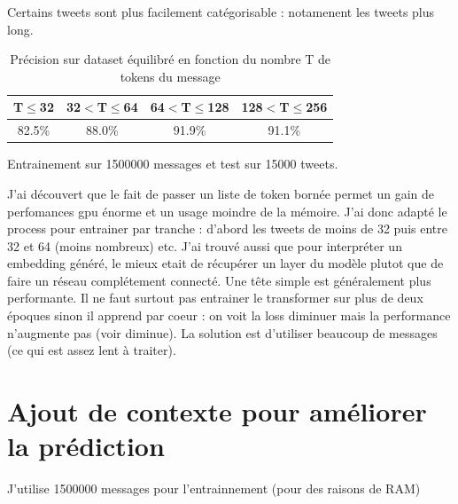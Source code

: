 \documentclass[12pt]{article}
\begin{document}
Certains tweets sont plus facilement catégorisable : notamenent les tweets plus long.


\begin{table}[h]
\caption{Précision sur dataset équilibré en fonction du nombre T de tokens du message}
\centering
\begin{tabular}{cccc}
\toprule
T$\le$32 & 32$<$T$\le$64 & 64$<$T$\le$128 & 128$<$T$\le$256 \\
\midrule
82.5\% & 88.0\% & 91.9\% & 91.1\% \\
\bottomrule
\end{tabular}

\vspace{2mm}
{\centering \small Entrainement sur 1500000 messages et test sur 15000 tweets.\par}

\end{table}


J'ai découvert que le fait de passer un liste de token bornée permet un gain de perfomances gpu énorme et un usage moindre de la mémoire.
J'ai donc adapté le process pour entrainer par tranche : d'abord les tweets de moins de 32 puis entre 32 et 64 (moins nombreux) etc.
J'ai trouvé aussi que pour interpréter un embedding généré, le mieux etait de récupérer un layer du modèle plutot que de faire un réseau complétement
connecté.
Une tête simple est généralement plus performante.
Il ne faut surtout pas entrainer le transformer sur plus de deux époques sinon il apprend par coeur : on voit la loss diminuer mais la performance 
n'augmente pas (voir diminue). La solution est d'utiliser beaucoup de messages (ce qui est assez lent à traiter).

\section{Ajout de contexte pour améliorer la prédiction}

J'utilise 1500000 messages pour l'entrainnement (pour des raisons de RAM)
\end{document}
